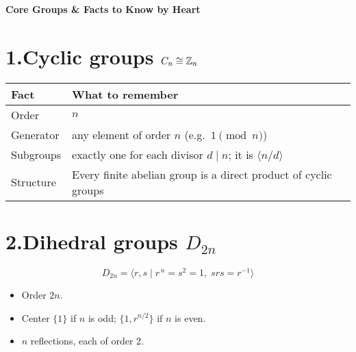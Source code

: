 \documentclass[12pt]{article}
\title{}
\author{Jerich Lee}
\date{\today}
\theoremstyle{definition} %
\theoremstyle{plain} %
\begin{document}
\maketitle

\begin{center}
  \Large\bfseries Core Groups \& Facts to Know by Heart
  \end{center}
  
  \bigskip
  \section*{1.\;Cyclic groups $C_{n}\cong\Bbb Z_{n}$}
  
  \begin{tabular}{|l|l|}
  \hline
  \textbf{Fact} & \textbf{What to remember}\\\hline
  Order               & $n$\\
  Generator           & any element of order $n$ (e.g.\ $1\pmod n$)\\
  Subgroups           & exactly one for each divisor $d\mid n$; it is $\langle n/d\rangle$\\
  Structure           & Every finite abelian group is a direct product of cyclic groups\\\hline
  \end{tabular}
  
  \bigskip
  \section*{2.\;Dihedral groups $D_{2n}$}
  
  \[
     D_{2n}= \langle r,s \mid r^{\,n}=s^{2}=1,\; srs=r^{-1}\rangle
  \]
  \begin{itemize}
    \item Order $2n$.
    \item Center $\{1\}$ if $n$ is odd; $\{1,r^{n/2}\}$ if $n$ is even.
    \item $n$ reflections, each of order $2$.
  \end{itemize}
  
  \bigskip
\end{document}
